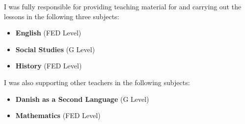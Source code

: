 
I was fully responsible for providing teaching material for and carrying out the lessons in the
following three subjects:

\medskip
\begin{itemize}
\item \textbf{English} (FED Level)
\item \textbf{Social Studies} (G Level)
\item \textbf{History} (FED Level)
\end{itemize}

I was also supporting other teachers in the following subjects:

\medskip
\begin{itemize}
\item \textbf{Danish as a Second Language} (G Level)
\item \textbf{Mathematics} (FED Level)
\end{itemize}
